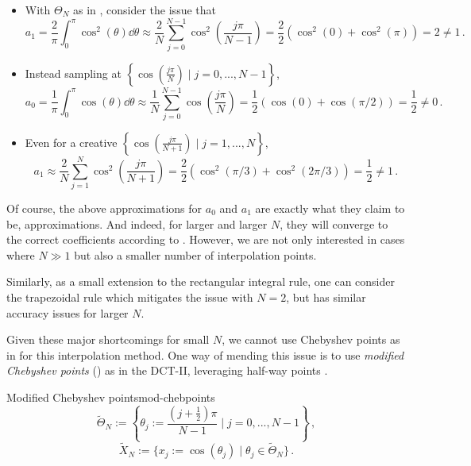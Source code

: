 \documentclass[12pt, a4paper]{article}
\newcommand{\chebyshev}{Chebyshev\xspace}
\begin{document}
  \begin{itemize}
    \item With $\Theta_N$ as in , consider the issue that
          $$a_1 = \frac{2}{\pi} \int_{0}^{\pi} \cos^2(\theta) \dd\theta \approx \frac{2}{N} \sum_{j=0}^{N-1} \cos^2\left(\frac{j \pi}{N-1}\right) = \frac{2}{2} \left(\cos^2(0) + \cos^2(\pi)\right) = 2 \neq 1 \,.$$
    \item Instead sampling at $\left\{\cos\left(\frac{j\pi}{N}\right) \;\big|\; j = 0, ..., N-1\right\}$,
          $$a_0 = \frac{1}{\pi} \int_0^\pi \cos(\theta) \dd\theta \approx \frac{1}{N} \sum_{j=0}^{N-1} \cos(\frac{j\pi}{N}) = \frac{1}{2} \left(\cos(0) + \cos(\pi/2)\right) = \frac{1}{2} \neq 0 \,.$$
    \item Even for a creative $\left\{\cos\left(\frac{j\pi}{N+1}\right) \;\big|\; j = 1, ..., N\right\}$,
          $$a_1 \approx \frac{2}{N} \sum_{j=1}^{N} \cos^2\left(\frac{j \pi}{N+1}\right) = \frac{2}{2} \left(\cos^2(\pi/3) + \cos^2(2\pi/3)\right) = \frac{1}{2} \neq 1 \,.$$
  \end{itemize}

  Of course, the above approximations for $a_0$ and $a_1$ are exactly what they claim to be, approximations.
  And indeed, for larger and larger $N$, they will converge to the correct coefficients according to .
  However, we are not only interested in cases where $N \gg 1$ but also a smaller number of interpolation points.

  Similarly, as a small extension to the rectangular integral rule, one can consider the trapezoidal rule which mitigates the issue with $N = 2$, but has similar accuracy issues for larger $N$.

  Given these major shortcomings for small $N$, we cannot use \chebyshev points as in  for this interpolation method.
  One way of mending this issue is to use \emph{modified \chebyshev points} () as in the DCT-II, leveraging half-way points \parencite{CombTrig}.

  \begin{definition}{Modified Chebyshev points}{mod-chebpoints}
    $$\tilde{\Theta}_N := \left\{\theta_j := \frac{(j + \frac{1}{2})\pi}{N-1} \;\bigg|\; j = 0, ..., N-1\right\} \,,$$
    $$\tilde{X}_N := \{x_j := \cos(\theta_j) \;|\; \theta_j \in \tilde{\Theta}_N\} \,.$$
  \end{definition}
\end{document}
